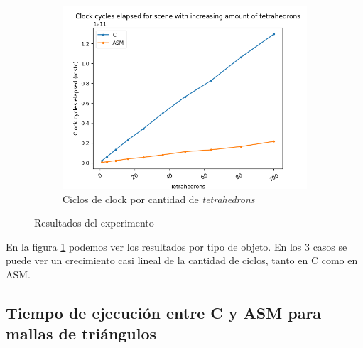 \begin{figure}
    \begin{subfigure}[b]{0.45\textwidth}
        \centering
        \includegraphics[width=\textwidth]{./imgs/exp3-tetra-c_vs_asm.png}
        \caption{Ciclos de clock por cantidad de \textit{tetrahedrons}}
    \end{subfigure}
    \caption{Resultados del experimento}
    \label{fig:exp3-res}
\end{figure}

En la figura \ref{fig:exp3-res} podemos ver los resultados por tipo de objeto.
En los 3 casos se puede ver un crecimiento casi lineal de la cantidad de ciclos,
tanto en C como en ASM.

%
%
%

\subsection{Tiempo de ejecución entre C y ASM para mallas de triángulos}


